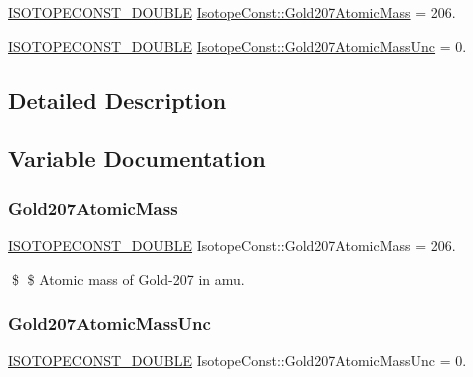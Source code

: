 \begin{DoxyCompactItemize}
\item 
\mbox{\hyperlink{group___isotope_const-_macros_ga8f45a7272ce02c0b4c65c44636ed719a}{I\+S\+O\+T\+O\+P\+E\+C\+O\+N\+S\+T\+\_\+\+D\+O\+U\+B\+LE}} \mbox{\hyperlink{group___isotope_const-_gold-_au207_ga9fad54b49a05192ceae960289bc2e08a}{Isotope\+Const\+::\+Gold207\+Atomic\+Mass}} = 206.
\item 
\mbox{\hyperlink{group___isotope_const-_macros_ga8f45a7272ce02c0b4c65c44636ed719a}{I\+S\+O\+T\+O\+P\+E\+C\+O\+N\+S\+T\+\_\+\+D\+O\+U\+B\+LE}} \mbox{\hyperlink{group___isotope_const-_gold-_au207_ga281f1aaadff6e89dab1c7471a34a916a}{Isotope\+Const\+::\+Gold207\+Atomic\+Mass\+Unc}} = 0.
\end{DoxyCompactItemize}


\subsection{Detailed Description}


\subsection{Variable Documentation}
\mbox{\label{group___isotope_const-_gold-_au207_ga9fad54b49a05192ceae960289bc2e08a}} 
\subsubsection{\texorpdfstring{Gold207\+Atomic\+Mass}{Gold207AtomicMass}}
{\footnotesize\ttfamily \mbox{\hyperlink{group___isotope_const-_macros_ga8f45a7272ce02c0b4c65c44636ed719a}{I\+S\+O\+T\+O\+P\+E\+C\+O\+N\+S\+T\+\_\+\+D\+O\+U\+B\+LE}} Isotope\+Const\+::\+Gold207\+Atomic\+Mass = 206.}

\$ \$ Atomic mass of Gold-\/207 in amu. \mbox{\label{group___isotope_const-_gold-_au207_ga281f1aaadff6e89dab1c7471a34a916a}} 
\subsubsection{\texorpdfstring{Gold207\+Atomic\+Mass\+Unc}{Gold207AtomicMassUnc}}
{\footnotesize\ttfamily \mbox{\hyperlink{group___isotope_const-_macros_ga8f45a7272ce02c0b4c65c44636ed719a}{I\+S\+O\+T\+O\+P\+E\+C\+O\+N\+S\+T\+\_\+\+D\+O\+U\+B\+LE}} Isotope\+Const\+::\+Gold207\+Atomic\+Mass\+Unc = 0.}

